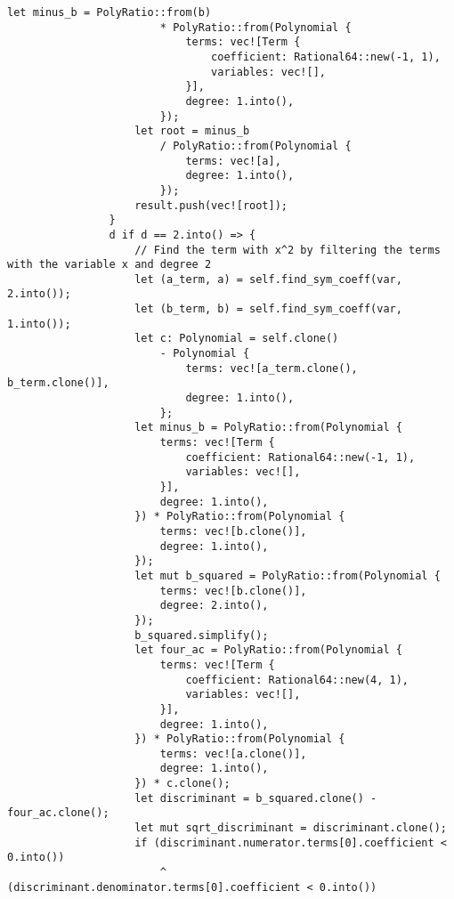 \begin{lstlisting}[caption={The implementation of the \texttt{roots()} method for the \texttt{Polynomial} struct}, label={lst:polynomial-roots}]
                    let minus_b = PolyRatio::from(b)
                        * PolyRatio::from(Polynomial {
                            terms: vec![Term {
                                coefficient: Rational64::new(-1, 1),
                                variables: vec![],
                            }],
                            degree: 1.into(),
                        });
                    let root = minus_b
                        / PolyRatio::from(Polynomial {
                            terms: vec![a],
                            degree: 1.into(),
                        });
                    result.push(vec![root]);
                }
                d if d == 2.into() => {
                    // Find the term with x^2 by filtering the terms with the variable x and degree 2
                    let (a_term, a) = self.find_sym_coeff(var, 2.into());
                    let (b_term, b) = self.find_sym_coeff(var, 1.into());
                    let c: Polynomial = self.clone()
                        - Polynomial {
                            terms: vec![a_term.clone(), b_term.clone()],
                            degree: 1.into(),
                        };
                    let minus_b = PolyRatio::from(Polynomial {
                        terms: vec![Term {
                            coefficient: Rational64::new(-1, 1),
                            variables: vec![],
                        }],
                        degree: 1.into(),
                    }) * PolyRatio::from(Polynomial {
                        terms: vec![b.clone()],
                        degree: 1.into(),
                    });
                    let mut b_squared = PolyRatio::from(Polynomial {
                        terms: vec![b.clone()],
                        degree: 2.into(),
                    });
                    b_squared.simplify();
                    let four_ac = PolyRatio::from(Polynomial {
                        terms: vec![Term {
                            coefficient: Rational64::new(4, 1),
                            variables: vec![],
                        }],
                        degree: 1.into(),
                    }) * PolyRatio::from(Polynomial {
                        terms: vec![a.clone()],
                        degree: 1.into(),
                    }) * c.clone();
                    let discriminant = b_squared.clone() - four_ac.clone();
                    let mut sqrt_discriminant = discriminant.clone();
                    if (discriminant.numerator.terms[0].coefficient < 0.into())
                        ^ (discriminant.denominator.terms[0].coefficient < 0.into())

\end{lstlisting}

